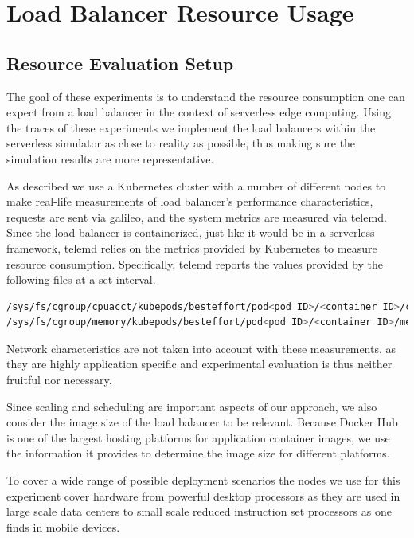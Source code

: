 \section{Load Balancer Resource Usage}
\subsection{Resource Evaluation Setup}
The goal of these experiments is to understand the resource consumption one can expect from a load balancer in the context of serverless edge computing.
Using the traces of these experiments we implement the load balancers within the serverless simulator as close to reality as possible, thus making sure the simulation results are more representative.

As described we use a Kubernetes cluster with a number of different nodes to make real-life measurements of load balancer's performance characteristics, requests are sent via galileo\cite{galileo-github}\cite{operating-energy-aware-galileo}, and the system metrics are measured via telemd\cite{telemd-github}.
Since the load balancer is containerized, just like it would be in a serverless framework, telemd relies on the metrics provided by Kubernetes to measure resource consumption.
Specifically, telemd reports the values provided by the following files at a set interval\cite{telemd-github}.
\begin{lstlisting}[language=Bash]
/sys/fs/cgroup/cpuacct/kubepods/besteffort/pod<pod ID>/<container ID>/cpuacct.usage
/sys/fs/cgroup/memory/kubepods/besteffort/pod<pod ID>/<container ID>/memory.stat
\end{lstlisting}
Network characteristics are not taken into account with these measurements, as they are highly application specific and experimental evaluation is thus neither fruitful nor necessary.

Since scaling and scheduling are important aspects of our approach, we also consider the image size of the load balancer to be relevant.
Because Docker Hub is one of the largest hosting platforms for application container images, we use the information it provides\cite{traefik-dockerhub} to determine the image size for different platforms.

To cover a wide range of possible deployment scenarios the nodes we use for this experiment cover hardware from powerful desktop processors as they are used in large scale data centers to small scale reduced instruction set processors as one finds in mobile devices.

